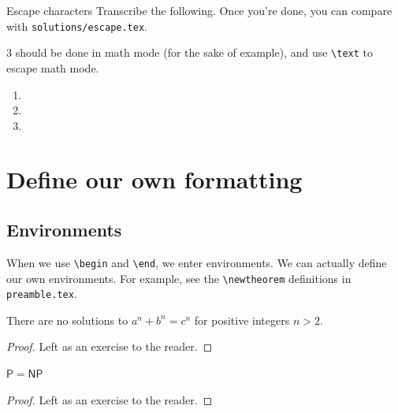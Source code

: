 \documentclass{article}
\begin{document}
\begin{exercise}{Escape characters}{}
    Transcribe the following. Once you're done, you can compare with \texttt{solutions/escape.tex}.

    

    3 should be done in math mode (for the sake of example), and use \texttt{\textbackslash text} to escape math mode.
    
\end{exercise}

\begin{solution}{}{}
    \begin{enumerate}
        \item 
        \item 
        \item
    \end{enumerate}
\end{solution}

\section{Define our own formatting}

\subsection{Environments}


When we use \texttt{\textbackslash begin} and \texttt{\textbackslash end}, we enter environments. We can actually define our own environments. For example, see the \texttt{\textbackslash newtheorem} definitions in \texttt{preamble.tex}.

\begin{theorem}
    There are no solutions to $a^n+b^n=c^n$ for positive integers $n > 2$.
\end{theorem}

\begin{proof}
    Left as an exercise to the reader.
\end{proof}

\begin{theorem}
    $\mathsf{P}=\mathsf{NP}$
\end{theorem}

\begin{proof}
    Left as an exercise to the reader.
\end{proof}
\end{document}
